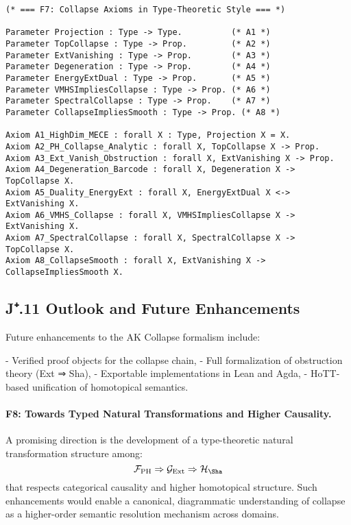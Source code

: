 \documentclass[11pt]{article}
\theoremstyle{definition}
\begin{document}
\begin{lstlisting}[language=Coq, caption=Collapse Axioms as Type-Theoretic Statements]
(* === F7: Collapse Axioms in Type-Theoretic Style === *)

Parameter Projection : Type -> Type.          (* A1 *)
Parameter TopCollapse : Type -> Prop.         (* A2 *)
Parameter ExtVanishing : Type -> Prop.        (* A3 *)
Parameter Degeneration : Type -> Prop.        (* A4 *)
Parameter EnergyExtDual : Type -> Prop.       (* A5 *)
Parameter VMHSImpliesCollapse : Type -> Prop. (* A6 *)
Parameter SpectralCollapse : Type -> Prop.    (* A7 *)
Parameter CollapseImpliesSmooth : Type -> Prop. (* A8 *)

Axiom A1_HighDim_MECE : forall X : Type, Projection X = X.
Axiom A2_PH_Collapse_Analytic : forall X, TopCollapse X -> Prop.
Axiom A3_Ext_Vanish_Obstruction : forall X, ExtVanishing X -> Prop.
Axiom A4_Degeneration_Barcode : forall X, Degeneration X -> TopCollapse X.
Axiom A5_Duality_EnergyExt : forall X, EnergyExtDual X <-> ExtVanishing X.
Axiom A6_VMHS_Collapse : forall X, VMHSImpliesCollapse X -> ExtVanishing X.
Axiom A7_SpectralCollapse : forall X, SpectralCollapse X -> TopCollapse X.
Axiom A8_CollapseSmooth : forall X, ExtVanishing X -> CollapseImpliesSmooth X.
\end{lstlisting}

\subsection*{J⁺.11 Outlook and Future Enhancements}

Future enhancements to the AK Collapse formalism include:

- Verified proof objects for the collapse chain,
- Full formalization of obstruction theory (Ext ⇒ Sha),
- Exportable implementations in Lean and Agda,
- HoTT-based unification of homotopical semantics.

\paragraph{F8: Towards Typed Natural Transformations and Higher Causality.}

A promising direction is the development of a type-theoretic  
natural transformation structure among:
\[
\mathcal{F}_{\text{PH}} \Rightarrow \mathcal{G}_{\text{Ext}} \Rightarrow \mathcal{H}_{\Sha}
\]
that respects categorical causality and higher homotopical structure.  
Such enhancements would enable a canonical, diagrammatic understanding  
of collapse as a higher-order semantic resolution mechanism across domains.
\end{document}
